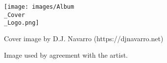 \documentclass[
  12pt,
  letterpaper,
  oneside,
  open=any]{scrbook}
\begin{document}
\begin{frontmatter}
\begin{titlepage}
\newcommand{\titlepagefooterblock}{
\footerstyled
}

\newcommand{\titlepagedateblock}{
\datestyled
}

\newcommand{\titleblock}{{

{\titlepagetitleblock}
}

\vspace{1.5cm}
}

\newcommand{\authorblock}{{\titlepageauthorblock}

\vspace{2\baselineskip}
}

\newcommand{\affiliationblock}{{\titlepageaffiliationblock}

\vspace{2\baselineskip}
}

\newcommand{\logoblock}{{\texttt{[image: images/Album\\\_Cover\\\_Logo.png]}}

\vspace{1cm}
}

\newcommand{\footerblock}{}

\newcommand{\dateblock}{}

\newcommand{\headerblock}{}

\thispagestyle{empty} %


\newlength{\minipagewidth}
\setlength{\minipagewidth}{\textwidth}
\raggedright %
\begin{minipage}[b][\textheight][s]{\minipagewidth}
\titlepagepagealign
\vspace{1.0cm}

\titleblock

\authorblock

\vfill

\logoblock

Cover image by D.J. Navarro (https://djnavarro.net)

Image used by agreement with the artist.

\vspace{0.8cm}

\footerblock
\par

\end{minipage}
\clearpage
\restoregeometry
\end{titlepage}
\setcounter{page}{1}
\end{frontmatter}
\end{document}

